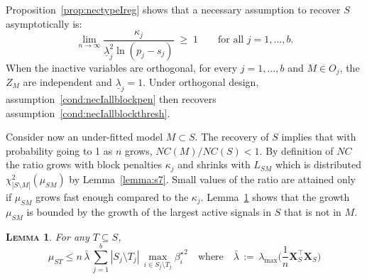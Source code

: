 \documentclass[aos]{imsart}
\theoremstyle{plain}
\newtheorem{lem}[thm]{\textsc{Lemma}}
\newcommand{\bs}{\boldsymbol}
\begin{document}
Proposition~\ref{prop:nectypeIreg} shows that 
a necessary assumption to recover $S$ asymptotically
is: 
\begin{equation}\label{cond:necIallblockpen}
\lim_{n\to\infty}\frac{\kappa_j}{\underline{\lambda}_j^2\ln(p_j-s_j)}\;\geq\;1\qquad\mbox{for all }j=1,\ldots,b.
\end{equation}
When the inactive variables are orthogonal, for every $j=1,\ldots,b$ and $M\in O_j$, the $Z_M$ are independent and $\underline{\lambda}_j=1$. Under orthogonal design, assumption~\eqref{cond:necIallblockpen} then recovers assumption~\eqref{cond:necIallblockthresh}.

Consider now an under-fitted model $M\subset S$. The recovery of $S$ implies that with probability going to 1 as $n$ grows, $NC(M)/NC(S)<1$. By definition of $NC$ the ratio grows with block penalties $\kappa_j$ and shrinks with $L_{SM}$ which is distributed $\chi^2_{|S\setminus M|}(\mu_{SM})$ by Lemma~\ref{lemma:s7}. Small values of the ratio are attained only if $\mu_{SM}$ grows fast enough compared to the $\kappa_j$. Lemma~\ref{lem:upperboundnoncentral} shows that the growth $\mu_{SM}$ is bounded by the growth of the largest active signals in $S$ that is not in $M$.
\begin{lem}\label{lem:upperboundnoncentral}
    For any $T\subseteq S$, $$\mu_{ST} \leq n\,\bar{\lambda}\,\sum_{j=1}^b|S_j\setminus T_j|\,\max_{i\in S_j\setminus T_j}{\beta_{i}^{\star}}^2 \quad \text{where}\quad \bar{\lambda}\,:=\,\lambda_{\max}\Big(\frac1n \bs X_{S}^\top\bs X_{S}\Big)$$
\end{lem}
\end{document}
